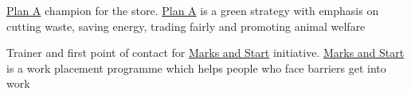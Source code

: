 \begin{cventries}
{\begin{cvitems}
        \item {\href{https://corporate.marksandspencer.com/plan-a}{Plan A} champion for the store. \href{https://corporate.marksandspencer.com/plan-a}{Plan A} is a green strategy with emphasis on cutting waste, saving energy, trading fairly and promoting animal welfare}
        \item {Trainer and first point of contact for \href{http://careers.marksandspencer.com/helping-you-find-work}{Marks and Start} initiative. \href{http://careers.marksandspencer.com/helping-you-find-work}{Marks and Start} is a work placement programme which helps people who face barriers get into work}
      \end{cvitems}
    }
\end{cventries}
